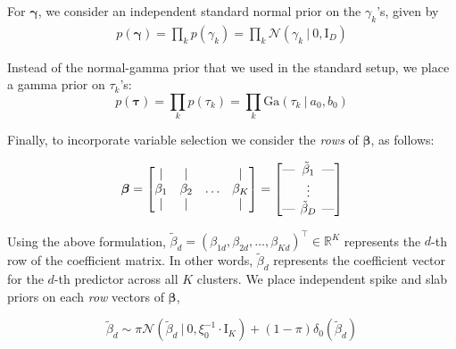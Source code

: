 \documentclass[twoside,11pt]{article}
\newcommand{\eye}{\mathrm{I}}
\newcommand\given[1][]{\:#1\vert\:}
\newcommand{\transpose}[1]{#1^{\intercal}}
\newcommand{\R}{\mathbb{R}}
\newcommand{\kprod}{\prod\limits_{k}}
\newcommand{\boldbeta}{\boldsymbol\beta}
\newcommand{\boldgamma}{\boldsymbol\gamma}
\newcommand{\boldtau}{\boldsymbol\tau}
\newcommand{\betad}{\tilde{\beta}_d}
\newcommand{\priorbeta}{\mathcal{N} \left( \betad \given 0, \xi_0^{-1} \cdot \mathrm{I}_K \right)}
\begin{document}
For $\boldgamma$, we consider an independent standard normal prior on the $\gamma_k$'s, given by
\begin{equation}
\begin{split}
	 p(\boldgamma) = \kprod p(\gamma_k) = \kprod \mathcal{N} \left( \gamma_k \given 0, \eye_D \right)
\end{split}
\end{equation}

Instead of the normal-gamma prior that we used in the standard setup, we place a gamma prior on $\tau_k$'s: 
\begin{equation}
	p(\boldtau) = \kprod p(\tau_k) = \kprod \mathrm{Ga} \left( \tau_k \given a_0, b_0 \right)
\end{equation}



Finally, to incorporate variable selection we consider the \textit{rows} of $\boldbeta$, as follows:

\[
\boldbeta = 
\begin{bmatrix}
    \vert &    \vert   &   &\vert\\
    \beta_1  & \beta_2 &   \ldots & \beta_K\\
    \vert &     \vert  &    &\vert
\end{bmatrix}
= 
\begin{bmatrix}
    \text{---} \hspace{-0.2cm} & \tilde{\beta}_1 & \hspace{-0.2cm} \text{---} \\
    \text{   } \hspace{-0.2cm} & \vdots          & \hspace{-0.2cm} \text{   } \\
    \text{---} \hspace{-0.2cm} & \tilde{\beta}_D & \hspace{-0.2cm} \text{---}
\end{bmatrix}
\]

Using the above formulation, $\betad = \transpose{\left( \beta_{1d}, \beta_{2d}, \ldots, \beta_{Kd}\right)} \in \R^K$ represents the $d$-th row of the coefficient matrix. In other words, $\betad$ represents the coefficient vector for the $d$-th predictor across all $K$ clusters. We place independent spike and slab priors on each \textit{row} vectors of $\boldbeta$, 

\begin{equation} 
	\betad \sim \pi \priorbeta + (1 - \pi) \delta_0 (\betad)
\end{equation}
\end{document}
